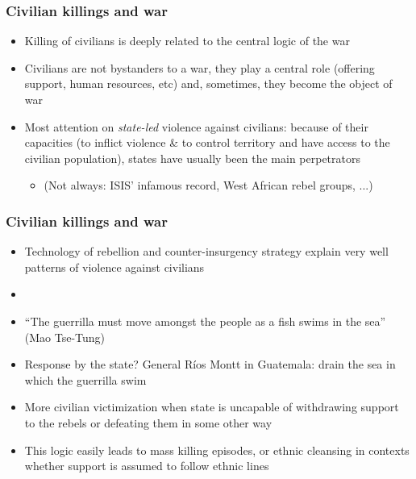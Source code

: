 \documentclass[aspectratio=43]{beamer}
\begin{document}
\begin{frame}
\frametitle{Civilian killings and war}
\centering

\begin{itemize}
  \item<1-> Killing of civilians is deeply related to the central logic of the war
  \item<2-> Civilians are not bystanders to a war, they play a central role (offering support, human resources, etc) and, sometimes, they become the object of war
  \item<3-> Most attention on \textit{state-led} violence against civilians: because of their capacities (to inflict violence \& to control territory and have access to the civilian population), states have usually been the main perpetrators
  \begin{itemize}
    \item[] (Not always: ISIS' infamous record, West African rebel groups, ...)
  \end{itemize}
\end{itemize}

\end{frame}

\begin{frame}
\frametitle{Civilian killings and war}
\centering

\begin{itemize}
  \item<1-> Technology of rebellion and counter-insurgency strategy explain very well patterns of violence against civilians
  \item[]
  \item<2-> ``The guerrilla must move amongst the people as a fish swims in the sea'' (Mao Tse-Tung)
  \item<2-> Response by the state? General Ríos Montt in Guatemala: drain the sea in which the guerrilla swim
  \item<3-> More civilian victimization when state is uncapable of withdrawing support to the rebels or defeating them in some other way
  \item<3-> This logic easily leads to mass killing episodes, or ethnic cleansing in contexts whether support is assumed to follow ethnic lines
\end{itemize}

\end{frame}
\end{document}
